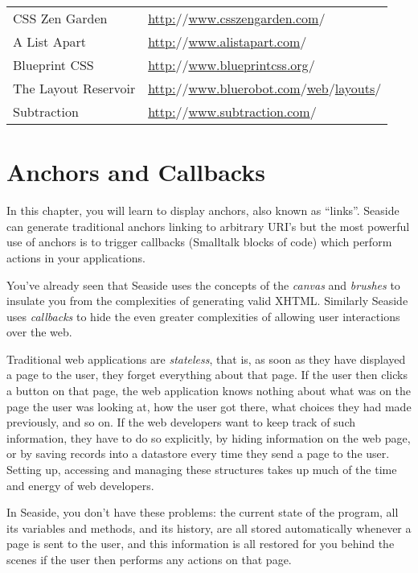 \documentclass[a4paper,10pt,twoside]{book}
\begin{document}
\begin{tabularx}{\textwidth}{lX}
 CSS Zen Garden & \href{http://www.csszengarden.com/}{http:$/$$/$www.csszengarden.com$/$}\\
 A List Apart & \href{http://www.alistapart.com/}{http:$/$$/$www.alistapart.com$/$}\\
 Blueprint CSS & \href{http://www.blueprintcss.org/}{http:$/$$/$www.blueprintcss.org$/$}\\
 The Layout Reservoir & \href{http://www.bluerobot.com/web/layouts/}{http:$/$$/$www.bluerobot.com$/$web$/$layouts$/$}\\
 Subtraction & \href{http://www.subtraction.com/}{http:$/$$/$www.subtraction.com$/$}\\
\end{tabularx}

\chapter{Anchors and Callbacks}
\label{book:fundamentals:anchors}

In this chapter, you will learn to display anchors, also known as ``links''. Seaside can generate traditional anchors linking to arbitrary URI's but the most powerful use of anchors is to trigger callbacks (Smalltalk blocks of code) which perform actions in your applications.

You've already seen that Seaside uses the concepts of the \textit{canvas} and \textit{brushes} to insulate you from the complexities of generating valid XHTML. Similarly Seaside uses \textit{callbacks} to hide the even greater complexities of allowing user interactions over the web.

Traditional web applications are \textit{stateless}, that is, as soon as they have displayed a page to the user, they forget everything about that page. If the user then clicks a button on that page, the web application knows nothing about what was on the page the user was looking at, how the user got there, what choices they had made previously, and so on. If the web developers want to keep track of such information, they have to do so explicitly, by hiding information on the web page, or by saving records into a datastore every time they send a page to the user. Setting up, accessing and managing these structures takes up much of the time and energy of web developers.

In Seaside, you don't have these problems: the current state of the program, all its variables and methods, and its history, are all stored automatically whenever a page is sent to the user, and this information is all restored for you behind the scenes if the user then performs any actions on that page.
\end{document}
